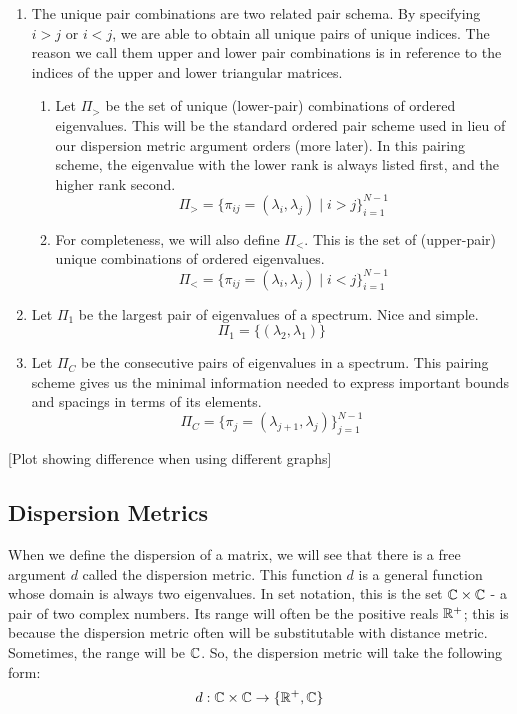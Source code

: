 \begin{enumerate}
  \item The unique pair combinations are two related pair schema. By specifying $i > j$ or $i < j$, we are able to obtain all unique pairs of unique indices. The reason we call them upper and lower pair combinations is in reference to the indices of the upper and lower triangular matrices. \begin{enumerate}
    \item Let $\Pi_>$ be the set of unique (lower-pair) combinations of ordered eigenvalues. This will be the standard ordered pair scheme used in lieu of our dispersion metric argument orders (more later). In this pairing scheme, the eigenvalue with the lower rank is always listed first, and the higher rank second.
    $$\Pi_> = \{\pi_{ij} = (\lambda_i,\lambda_j) \mid i > j\}_{i = 1}^{N-1}$$
    \item For completeness, we will also define $\Pi_<$. This is the set of (upper-pair) unique combinations of ordered eigenvalues. 
    $$\Pi_< = \{\pi_{ij} = (\lambda_i,\lambda_j) \mid i < j\}_{i = 1}^{N-1}$$
  \end{enumerate}
\item Let $\Pi_1$ be the largest pair of eigenvalues of a spectrum. Nice and simple.
$$\Pi_1 = \{(\lambda_2,\lambda_1)\}$$
\item Let $\Pi_C$ be the consecutive pairs of eigenvalues in a spectrum. This pairing scheme gives us the minimal information needed to express important bounds and spacings in terms of its elements.
$$\Pi_C = \{\pi_{j} = (\lambda_{j + 1},\lambda_j)\}_{j = 1}^{N-1}$$
\end{enumerate}

[Plot showing difference when using different graphs]


\subsection{Dispersion Metrics}

When we define the dispersion of a matrix, we will see that there is a free argument $d$ called the dispersion metric. This function $d$ is a general function whose domain is always two eigenvalues. In set notation, this is the set $\mathbb{C} \times \mathbb{C}$ - a pair of two complex numbers. Its range will often be the positive reals $\mathbb{R}^+$; this is because the dispersion metric often will be substitutable with distance metric. Sometimes, the range will be $\mathbb{C}$. So, the dispersion metric will take the following form:
\begin{align*}
d: \mathbb{C} \times \mathbb{C} \to \{\mathbb{R}^+, \mathbb{C}\}
\end{align*}

